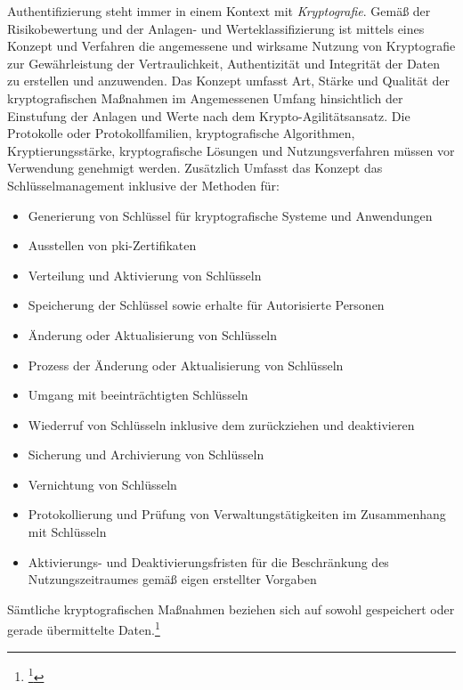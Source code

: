 \documentclass[11pt,a4paper,hidelinks]{article}   %
\begin{document}
                Authentifizierung steht immer in einem Kontext mit \emph{Kryptografie}. Gemäß der Risikobewertung und der Anlagen- und Werteklassifizierung ist mittels eines Konzept und Verfahren die angemessene und wirksame Nutzung von Kryptografie zur Gewährleistung der Vertraulichkeit, Authentizität und Integrität der Daten zu erstellen und anzuwenden. Das Konzept umfasst Art, Stärke und Qualität der kryptografischen Maßnahmen im Angemessenen Umfang hinsichtlich der Einstufung der Anlagen und Werte nach dem Krypto-Agilitätsansatz. Die Protokolle oder Protokollfamilien, kryptografische Algorithmen, Kryptierungsstärke, kryptografische Lösungen und Nutzungsverfahren müssen vor Verwendung genehmigt werden. Zusätzlich Umfasst das Konzept das Schlüsselmanagement inklusive der Methoden für:
                \begin{itemize}
                    \item Generierung von Schlüssel für kryptografische Systeme und Anwendungen
                    \item Ausstellen von \gls{pki}-Zertifikaten
                    \item Verteilung und Aktivierung von Schlüsseln
                    \item Speicherung der Schlüssel sowie erhalte für Autorisierte Personen
                    \item Änderung oder Aktualisierung von Schlüsseln
                    \item Prozess der Änderung oder Aktualisierung von Schlüsseln
                    \item Umgang mit beeinträchtigten Schlüsseln
                    \item Wiederruf von Schlüsseln inklusive dem zurückziehen und deaktivieren
                    \item Sicherung und Archivierung von Schlüsseln
                    \item Vernichtung von Schlüsseln
                    \item Protokollierung und Prüfung von Verwaltungstätigkeiten im Zusammenhang mit Schlüsseln
                    \item Aktivierungs- und Deaktivierungsfristen für die Beschränkung des Nutzungszeitraumes gemäß eigen erstellter Vorgaben
                \end{itemize}Sämtliche kryptografischen Maßnahmen beziehen sich auf sowohl gespeichert oder gerade übermittelte Daten.\footnote{
                    \footcite[Vgl. Anhang, Nummer 9][]{EU2024-2690}
                }\medbreak
                
\end{document}
